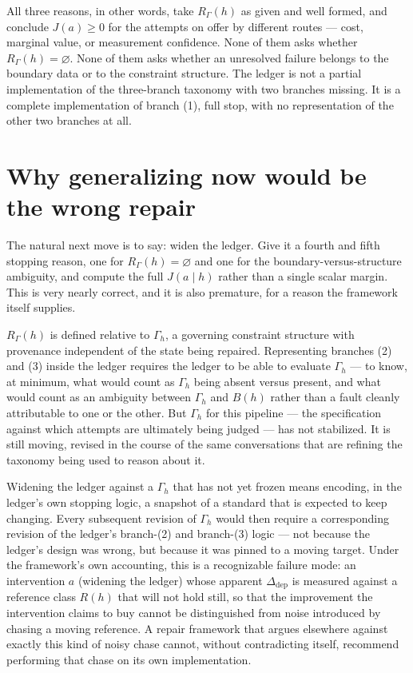 \documentclass[11pt,openany]{book}
\begin{document}
All three reasons, in other words, take $R_\Gamma(h)$ as given and well formed, and conclude $J(a) \geq 0$ for the attempts on offer by different routes — cost, marginal value, or measurement confidence. None of them asks whether $R_\Gamma(h) = \varnothing$. None of them asks whether an unresolved failure belongs to the boundary data or to the constraint structure. The ledger is not a partial implementation of the three-branch taxonomy with two branches missing. It is a complete implementation of branch (1), full stop, with no representation of the other two branches at all.

\section{Why generalizing now would be the wrong repair}

The natural next move is to say: widen the ledger. Give it a fourth and fifth stopping reason, one for $R_\Gamma(h) = \varnothing$ and one for the boundary-versus-structure ambiguity, and compute the full $J(a\mid h)$ rather than a single scalar margin. This is very nearly correct, and it is also premature, for a reason the framework itself supplies.

$R_\Gamma(h)$ is defined relative to $\Gamma_h$, a governing constraint structure with provenance independent of the state being repaired. Representing branches (2) and (3) inside the ledger requires the ledger to be able to evaluate $\Gamma_h$ — to know, at minimum, what would count as $\Gamma_h$ being absent versus present, and what would count as an ambiguity between $\Gamma_h$ and $B(h)$ rather than a fault cleanly attributable to one or the other. But $\Gamma_h$ for this pipeline — the specification against which attempts are ultimately being judged — has not stabilized. It is still moving, revised in the course of the same conversations that are refining the taxonomy being used to reason about it.

Widening the ledger against a $\Gamma_h$ that has not yet frozen means encoding, in the ledger's own stopping logic, a snapshot of a standard that is expected to keep changing. Every subsequent revision of $\Gamma_h$ would then require a corresponding revision of the ledger's branch-(2) and branch-(3) logic — not because the ledger's design was wrong, but because it was pinned to a moving target. Under the framework's own accounting, this is a recognizable failure mode: an intervention $a$ (widening the ledger) whose apparent $\Delta_{\mathrm{dep}}$ is measured against a reference class $R(h)$ that will not hold still, so that the improvement the intervention claims to buy cannot be distinguished from noise introduced by chasing a moving reference. A repair framework that argues elsewhere against exactly this kind of noisy chase cannot, without contradicting itself, recommend performing that chase on its own implementation.
\end{document}
